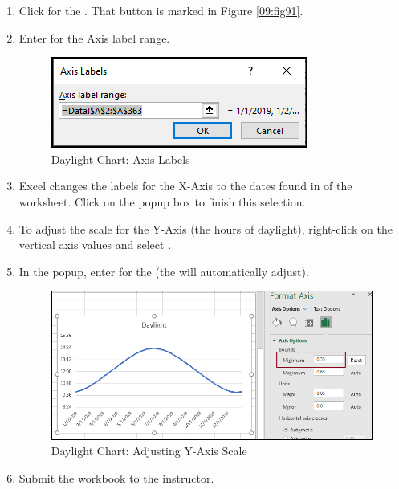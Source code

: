 \begin{enumerate}
	\item Click  for the . That button is marked in Figure \ref{09:fig91}.
	\item Enter  for the Axis label range.
	
	\begin{figure}[H]
		\centering
		\includegraphics[width=\maxwidth{.95\linewidth}]{gfx/ch09_fig92}
		\caption{Daylight Chart: Axis Labels}
		\label{09:fig92}
	\end{figure}
	
	\item Excel changes the labels for the X-Axis to the dates found in  of the  worksheet. Click  on the  popup box to finish this selection.
	\item To adjust the scale for the Y-Axis (the hours of daylight), right-click on the vertical axis values and select .
	\item In the  popup, enter  for the  (the  will automatically adjust).
	
	\begin{figure}[H]
		\centering
		\includegraphics[width=\maxwidth{.95\linewidth}]{gfx/ch09_fig93}
		\caption{Daylight Chart: Adjusting Y-Axis Scale}
		\label{09:fig93}
	\end{figure}
	
	\item Submit the  workbook to the instructor.
\end{enumerate}





	


